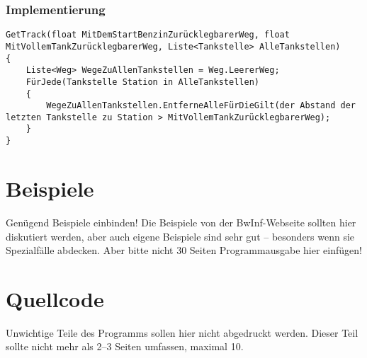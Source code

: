 \documentclass[a4paper,10pt,ngerman]{scrartcl}
\begin{document}
\subsubsection{Implementierung}
\begin{lstlisting}
GetTrack(float MitDemStartBenzinZurücklegbarerWeg, float MitVollemTankZurücklegbarerWeg, Liste<Tankstelle> AlleTankstellen)
{
	Liste<Weg> WegeZuAllenTankstellen = Weg.LeererWeg;
	FürJede(Tankstelle Station in AlleTankstellen)
	{
		WegeZuAllenTankstellen.EntferneAlleFürDieGilt(der Abstand der letzten Tankstelle zu Station > MitVollemTankZurücklegbarerWeg);
	}
}
\end{lstlisting}
\section{Beispiele}
Genügend Beispiele einbinden! Die Beispiele von der BwInf-Webseite sollten hier diskutiert werden, aber auch eigene Beispiele sind sehr gut – besonders wenn sie Spezialfälle abdecken. Aber bitte nicht 30 Seiten Programmausgabe hier einfügen!

\section{Quellcode}
Unwichtige Teile des Programms sollen hier nicht abgedruckt werden. Dieser Teil sollte nicht mehr als 2–3 Seiten umfassen, maximal 10.
\end{document}
